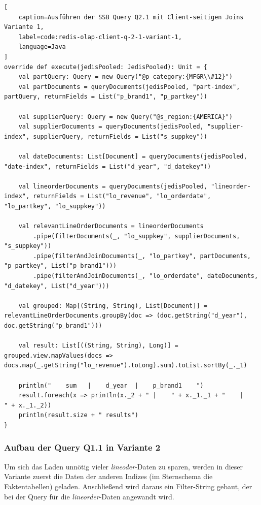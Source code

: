 \begin{lstlisting}[
    caption=Ausführen der SSB Query Q2.1 mit Client-seitigen Joins Variante 1,
    label=code:redis-olap-client-q-2-1-variant-1,
    language=Java
]
override def execute(jedisPooled: JedisPooled): Unit = {
	val partQuery: Query = new Query("@p_category:{MFGR\\#12}")
	val partDocuments = queryDocuments(jedisPooled, "part-index", partQuery, returnFields = List("p_brand1", "p_partkey"))

	val supplierQuery: Query = new Query("@s_region:{AMERICA}")
	val supplierDocuments = queryDocuments(jedisPooled, "supplier-index", supplierQuery, returnFields = List("s_suppkey"))

	val dateDocuments: List[Document] = queryDocuments(jedisPooled, "date-index", returnFields = List("d_year", "d_datekey"))

	val lineorderDocuments = queryDocuments(jedisPooled, "lineorder-index", returnFields = List("lo_revenue", "lo_orderdate", "lo_partkey", "lo_suppkey"))

	val relevantLineOrderDocuments = lineorderDocuments
		.pipe(filterDocuments(_, "lo_suppkey", supplierDocuments, "s_suppkey"))
		.pipe(filterAndJoinDocuments(_, "lo_partkey", partDocuments, "p_partkey", List("p_brand1")))
		.pipe(filterAndJoinDocuments(_, "lo_orderdate", dateDocuments, "d_datekey", List("d_year")))

	val grouped: Map[(String, String), List[Document]] = relevantLineOrderDocuments.groupBy(doc => (doc.getString("d_year"), doc.getString("p_brand1")))

	val result: List[((String, String), Long)] = grouped.view.mapValues(docs => docs.map(_.getString("lo_revenue").toLong).sum).toList.sortBy(_._1)

	println("    sum   |    d_year  |    p_brand1    ")
	result.foreach(x => println(x._2 + " |    " + x._1._1 + "    |    " + x._1._2))
	println(result.size + " results")
}
\end{lstlisting}


\subsubsection{Aufbau der Query Q1.1 in Variante 2}
Um sich das Laden unnötig vieler \emph{lineoder}-Daten zu sparen, werden in dieser Variante zuerst die Daten der anderen Indizes (im Sternschema die Faktentabellen) geladen. Anschließend wird daraus ein Filter-String gebaut, der bei der Query für die \emph{lineorder}-Daten angewandt wird.


